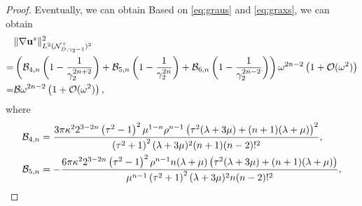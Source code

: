 \documentclass[11pt,reqno,twoside]{amsart}
\theoremstyle{definition}
\theoremstyle{remark}
\numberwithin{equation}{section}
\newcommand{\bu}{\mathbf{u}}
\newcommand{\bx}{\mathbf{x}}
\begin{document}
\begin{proof}
				Eventually, we can obtain
				\fi
				Based on \eqref{eq:graus} and \eqref{eq:graxs}, we can obtain
				\begin{align}\label{eq:graufss}
					&\|\nabla\bu^s\|_{L^{2}(\mathcal{N}_{D,\gamma_{2}-1}^{+})^2 }^{2}\\ %
					=&\left(\mathcal{B}_{4,n}\left(1-\frac{1}{\gamma _{2}^{2n+2}}\right)+\mathcal{B}_{5,n}\left(1-\frac{1}{\gamma _{2}^{2n}}\right)+\mathcal{B}_{6,n}\left(1-\frac{1}{\gamma _{2}^{2n-2}}\right)\right)\omega ^{2n-2}\left(1+\mathcal{O}(\omega^2  )\right)	\notag\\
					=&\mathcal{B}\omega ^{2n-2}\left(1+\mathcal{O}(\omega^2  )\right),\notag
				\end{align}
				where
				\begin{align}
					\mathcal{B}_{4,n}&=\frac{3\pi \kappa^2 2^{3-2 n} \left(\tau ^2-1\right)^2 \mu ^{1-n} \rho ^{n-1}\left(\tau ^2 (\lambda +3 \mu )+(n+1) (\lambda +\mu )\right)^2 }{\left(\tau ^2+1\right)^2 (\lambda +3 \mu )^2 (n+1) (n-2)!^2},\notag \\
					\mathcal{B}_{5,n}&=-\frac{6 \pi\kappa^2 2^{3-2 n} \left(\tau ^2-1\right)^2  \rho ^{n-1} n (\lambda +\mu ) \left(\tau ^2 (\lambda +3 \mu )+(n+1) (\lambda +\mu )\right) }{\mu ^{n-1}\left(\tau ^2+1\right)^2 (\lambda +3 \mu )^2  n(n-2)!^2},\notag\\

\end{align}
\end{proof}
\end{document}
